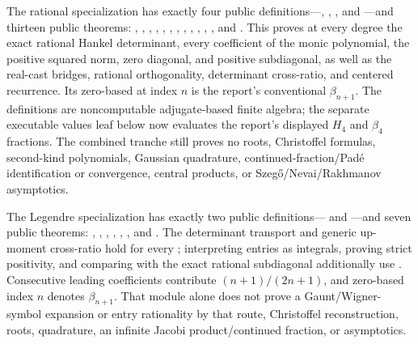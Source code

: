 \documentclass[11pt]{article}
\theoremstyle{definition}
\theoremstyle{remark}
\begin{document}
\begin{remark}
The rational specialization  has exactly four
public definitions---,
, , and
---and thirteen public theorems:
,
, ,
,
,
,
, ,
,
,
,
, and
.  This proves at every degree the
exact rational Hankel determinant, every coefficient of the monic polynomial,
the positive squared norm, zero diagonal, and positive subdiagonal, as well as
the real-cast bridges, rational orthogonality, determinant cross-ratio, and
centered recurrence.  Its zero-based  at
index \(n\) is the report's conventional \(\beta_{n+1}\).  The definitions are
noncomputable adjugate-based finite algebra; the separate executable values leaf
below now evaluates the report's displayed \(H_4\) and \(\beta_4\) fractions.
The combined tranche still proves no roots, Christoffel formulas, second-kind polynomials, Gaussian
quadrature, continued-fraction/Pad\'e identification or convergence, central
products, or Szeg\H{o}/Nevai/Rakhmanov asymptotics.

The Legendre specialization  has
exactly two public definitions--- and
---and seven public theorems:
,
,
, ,
,
, and
.
The determinant transport and generic up-moment cross-ratio hold for every
; interpreting entries as integrals, proving strict
positivity, and comparing with the exact rational subdiagonal additionally use
.  Consecutive leading coefficients contribute
\((n+1)/(2n+1)\), and zero-based index \(n\) denotes \(\beta_{n+1}\).  That module
alone does not prove a Gaunt/Wigner-symbol expansion or entry rationality by that
route, Christoffel reconstruction, roots, quadrature, an infinite Jacobi
product/continued fraction, or asymptotics.


\end{remark}
\end{document}
